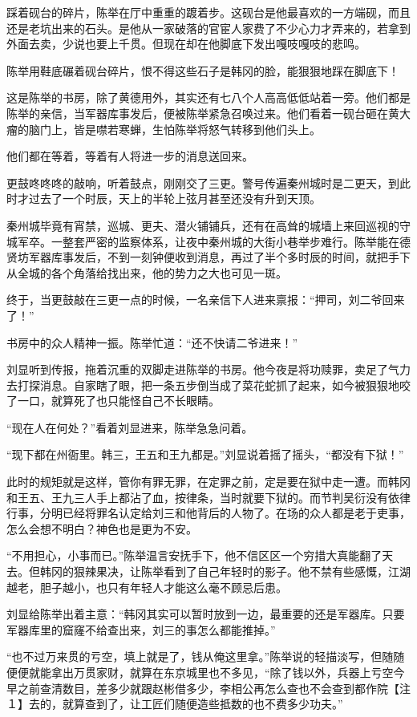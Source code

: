 踩着砚台的碎片，陈举在厅中重重的踱着步。这砚台是他最喜欢的一方端砚，而且还是老坑出来的石头。是他从一家破落的官宦人家费了不少心力才弄来的，若拿到外面去卖，少说也要上千贯。但现在却在他脚底下发出嘎吱嘎吱的悲鸣。

陈举用鞋底碾着砚台碎片，恨不得这些石子是韩冈的脸，能狠狠地踩在脚底下！

这是陈举的书房，除了黄德用外，其实还有七八个人高高低低站着一旁。他们都是陈举的亲信，当军器库事发后，便被陈举紧急召唤过来。他们看着一砚台砸在黄大瘤的脑门上，皆是噤若寒蝉，生怕陈举将怒气转移到他们头上。

他们都在等着，等着有人将进一步的消息送回来。

更鼓咚咚咚的敲响，听着鼓点，刚刚交了三更。警号传遍秦州城时是二更天，到此时才过去了一个时辰，天上的半轮上弦月甚至还没有升到天顶。

秦州城毕竟有宵禁，巡城、更夫、潜火铺铺兵，还有在高耸的城墙上来回巡视的守城军卒。一整套严密的监察体系，让夜中秦州城的大街小巷举步难行。陈举能在德贤坊军器库事发后，不到一刻钟便收到消息，再过了半个多时辰的时间，就把手下从全城的各个角落给找出来，他的势力之大也可见一斑。

终于，当更鼓敲在三更一点的时候，一名亲信下人进来禀报：“押司，刘二爷回来了！”

书房中的众人精神一振。陈举忙道：“还不快请二爷进来！”

刘显听到传报，拖着沉重的双脚走进陈举的书房。他今夜是将功赎罪，卖足了气力去打探消息。自家瞎了眼，把一条五步倒当成了菜花蛇抓了起来，如今被狠狠地咬了一口，就算死了也只能怪自己不长眼睛。

“现在人在何处？”看着刘显进来，陈举急急问着。

“现下都在州衙里。韩三，王五和王九都是。”刘显说着摇了摇头，“都没有下狱！”

此时的规矩就是这样，管你有罪无罪，在定罪之前，定是要在狱中走一遭。而韩冈和王五、王九三人手上都沾了血，按律条，当时就要下狱的。而节判吴衍没有依律行事，分明已经将罪名认定给刘三和他背后的人物了。在场的众人都是老于吏事，怎么会想不明白？神色也是更为不安。

“不用担心，小事而已。”陈举温言安抚手下，他不信区区一个穷措大真能翻了天去。但韩冈的狠辣果决，让陈举看到了自己年轻时的影子。他不禁有些感慨，江湖越老，胆子越小，也只有年轻人才能这么毫不顾忌后患。

刘显给陈举出着主意：“韩冈其实可以暂时放到一边，最重要的还是军器库。只要军器库里的窟窿不给查出来，刘三的事怎么都能推掉。”

“也不过万来贯的亏空，填上就是了，钱从俺这里拿。”陈举说的轻描淡写，但随随便便就能拿出万贯家财，就算在东京城里也不多见，“除了钱以外，兵器上亏空今早之前查清数目，差多少就跟赵彬借多少，李相公再怎么查也不会查到都作院【注１】去的，就算查到了，让工匠们随便造些抵数的也不费多少功夫。”


